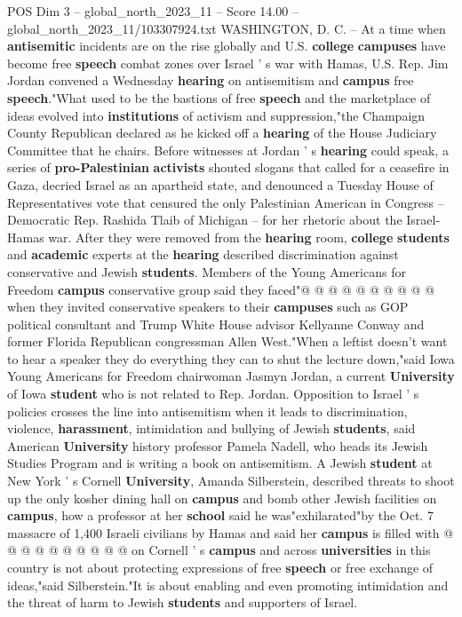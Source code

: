 \begin{textsample}{POS Dim 3 – global\_north\_2023\_11 – Score 14.00 – global\_north\_2023\_11/103307924.txt}  \label{ex:f3_pos_169}
WASHINGTON, D.
C. -- At a time when \textbf{antisemitic} incidents are on the rise globally and U.S. \textbf{college} \textbf{campuses} have become free \textbf{speech} combat zones over Israel ' s war with Hamas, U.S.
Rep.
Jim Jordan convened a Wednesday \textbf{hearing} on antisemitism and \textbf{campus} free \textbf{speech}."What used to be the bastions of free \textbf{speech} and the marketplace of ideas evolved into \textbf{institutions} of activism and suppression,"the Champaign County Republican declared as he kicked off a \textbf{hearing} of the House Judiciary Committee that he chairs.
Before witnesses at Jordan ' s \textbf{hearing} could speak, a series of \textbf{pro-Palestinian} \textbf{activists} shouted slogans that called for a ceasefire in Gaza, decried Israel as an apartheid state, and denounced a Tuesday House of Representatives vote that censured the only Palestinian American in Congress -- Democratic Rep.
Rashida Tlaib of Michigan -- for her rhetoric about the Israel-Hamas war.
After they were removed from the \textbf{hearing} room, \textbf{college} \textbf{students} and \textbf{academic} experts at the \textbf{hearing} described discrimination against conservative and Jewish \textbf{students}.
Members of the Young Americans for Freedom \textbf{campus} conservative group said they faced"@ @ @ @ @ @ @ @ @ @ when they invited conservative speakers to their \textbf{campuses} such as GOP political consultant and Trump White House advisor Kellyanne Conway and former Florida Republican congressman Allen West."When a leftist doesn't want to hear a speaker they do everything they can to shut the lecture down,"said Iowa Young Americans for Freedom chairwoman Jasmyn Jordan, a current \textbf{University} of Iowa \textbf{student} who is not related to Rep.
Jordan.
Opposition to Israel ' s policies crosses the line into antisemitism when it leads to discrimination, violence, \textbf{harassment}, intimidation and bullying of Jewish \textbf{students}, said American \textbf{University} history professor Pamela Nadell, who heads its Jewish Studies Program and is writing a book on antisemitism.
A Jewish \textbf{student} at New York ' s Cornell \textbf{University}, Amanda Silberstein, described threats to shoot up the only kosher dining hall on \textbf{campus} and bomb other Jewish facilities on \textbf{campus}, how a professor at her \textbf{school} said he was"exhilarated"by the Oct. 7 massacre of 1,400 Israeli civilians by Hamas and said her \textbf{campus} is filled with @ @ @ @ @ @ @ @ @ @ on Cornell ' s \textbf{campus} and across \textbf{universities} in this country is not about protecting expressions of free \textbf{speech} or free exchange of ideas,"said Silberstein."It is about enabling and even promoting intimidation and the threat of harm to Jewish \textbf{students} and supporters of Israel.

\end{textsample}
